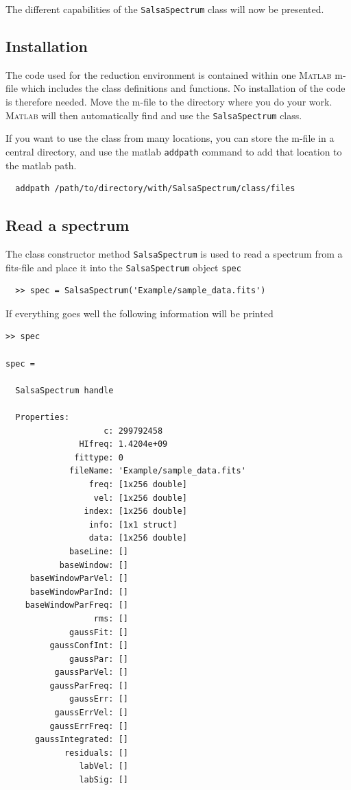 \documentclass[11pt,a4paper]{article}
\begin{document}
The different capabilities of the \texttt{SalsaSpectrum} class will
now be presented.


\subsection{Installation}
\label{sec:installation}

The code used for the reduction environment is contained within one
\textsc{Matlab} m-file which includes the class definitions and functions. No
installation of the code is therefore needed. Move the m-file to the
directory where you do your work. \textsc{Matlab} will then automatically find
and use the \texttt{SalsaSpectrum} class.

If you want to use the class from many locations, you can store the
m-file in a central directory, and use the matlab \texttt{addpath}
command to add that location to the matlab path.

\begin{lstlisting}
  addpath /path/to/directory/with/SalsaSpectrum/class/files
\end{lstlisting}

\subsection{Read a spectrum}
\label{readaspectrum}

The class constructor method \texttt{SalsaSpectrum} is used to read a
spectrum from a fits-file and place it into the \texttt{SalsaSpectrum}
object \texttt{spec}

\begin{lstlisting}
  >> spec = SalsaSpectrum('Example/sample_data.fits')
\end{lstlisting}
If everything goes well the following information will be printed 
\begin{lstlisting}
>> spec

spec = 

  SalsaSpectrum handle

  Properties:
                    c: 299792458
               HIfreq: 1.4204e+09
              fittype: 0
             fileName: 'Example/sample_data.fits'
                 freq: [1x256 double]
                  vel: [1x256 double]
                index: [1x256 double]
                 info: [1x1 struct]
                 data: [1x256 double]
             baseLine: []
           baseWindow: []
     baseWindowParVel: []
     baseWindowParInd: []
    baseWindowParFreq: []
                  rms: []
             gaussFit: []
         gaussConfInt: []
             gaussPar: []
          gaussParVel: []
         gaussParFreq: []
             gaussErr: []
          gaussErrVel: []
         gaussErrFreq: []
      gaussIntegrated: []
            residuals: []
               labVel: []
               labSig: []
\end{lstlisting}
\end{document}
